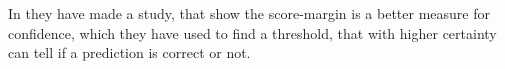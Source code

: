 \begin{description}
	In \cite{park_big/little_2015} they have made a study, that show the score-margin is a better measure for confidence, which they have used to find a threshold, that with higher certainty can tell if a prediction is correct or not.  
\end{description}


